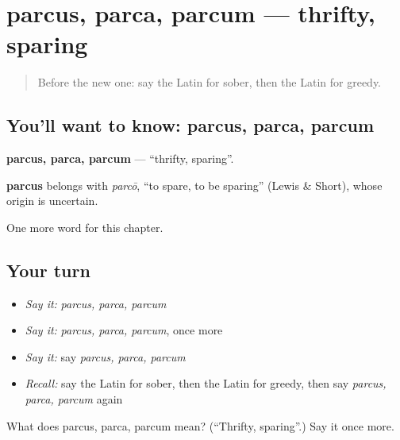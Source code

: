 \section[parcus, parca, parcum]{parcus, parca, parcum — thrifty, sparing}

\label{lesson:LA-C269-parcus}



\begin{quote}
Before the new one: say the Latin for sober, then the Latin for greedy.
\end{quote}

\subsection*{You'll want to know: parcus, parca, parcum}
\textbf{parcus, parca, parcum} — \textquotedblleft{}thrifty, sparing\textquotedblright{}.

\begin{cousinweb}
\textbf{parcus} belongs with \emph{parcō}, \textquotedblleft{}to spare, to be sparing\textquotedblright{} (Lewis \& Short), whose origin is uncertain.
\end{cousinweb}

\begin{grammarlens}[title={What you've built}]
One more word for this chapter.
\end{grammarlens}

\subsection*{Your turn}
\begin{itemize}
\raggedright
  \item \emph{Say it:} \emph{parcus, parca, parcum}
  \item \emph{Say it:} \emph{parcus, parca, parcum}, once more
  \item \emph{Say it:} say \emph{parcus, parca, parcum}
  \item \emph{Recall:} say the Latin for sober, then the Latin for greedy, then say \emph{parcus, parca, parcum} again
\end{itemize}

\begin{tcolorbox}[breakable,colback=teal!4,colframe=teal!35!black,title={Before you move on}]
What does parcus, parca, parcum mean? (\textquotedblleft{}Thrifty, sparing\textquotedblright{}.) Say it once more.
\end{tcolorbox}

